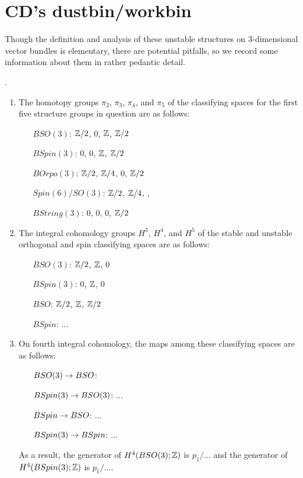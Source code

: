 \documentclass{amsart}
\begin{document}
\section{CD's dustbin/workbin}




Though the definition and analysis of these unstable structures on 3-dimensional vector bundles is elementary, there are potential pitfalls, so we record some information about them in rather pedantic detail.
\begin{proposition} 
.
\begin{enumerate}
%
\item
The homotopy groups $\pi_2$, $\pi_3$, $\pi_4$, and $\pi_5$ of the classifying spaces for the first five structure groups in question are as follows:
\begin{itemize}
\item[$BSO(3)$:] $\mathbb Z/2$, $0$, $\mathbb Z$, $\mathbb Z/2$
\item[$BSpin(3)$:] $0$, $0$, $\mathbb Z$, $\mathbb Z/2$
\item[$BOrpo(3)$:] $\mathbb Z/2$, $\mathbb Z/4$, $0$, $\mathbb Z/2$
\item[$Spin(6)/SO(3)$:] $\mathbb Z/2$, $\mathbb Z/4$, , 
\item[$BString(3)$:] $0$, $0$, $0$, $\mathbb Z/2$
\end{itemize}
%
\item
The integral cohomology groups $H^3$, $H^4$, and $H^5$ of the stable and unstable orthogonal and spin classifying spaces are as follows:
\begin{itemize}
\item[$BSO(3)$:] $\mathbb Z/2$, $\mathbb Z$, $0$
\item[$BSpin(3)$:] $0$, $\mathbb Z$, $0$
\item[$BSO$:] $\mathbb Z/2$, $\mathbb Z$, $\mathbb Z/2$
\item[$BSpin$:] ...
\end{itemize}
%
\item 
On fourth integral cohomology, the maps among these classifying spaces are as follows:
\begin{itemize}
\item[$BSO(3) \rightarrow BSO$:] 
\item[$BSpin(3) \rightarrow BSO(3)$:] ...
\item[$BSpin \rightarrow BSO$:] ...
\item[$BSpin(3) \rightarrow BSpin$:] ...
\end{itemize}
As a result, the generator of $H^4(BSO(3);\mathbb Z)$ is $p_1/...$ and the generator of $H^4(BSpin(3);\mathbb Z)$ is $p_1/...$.
\end{enumerate}
\end{proposition}
\end{document}
